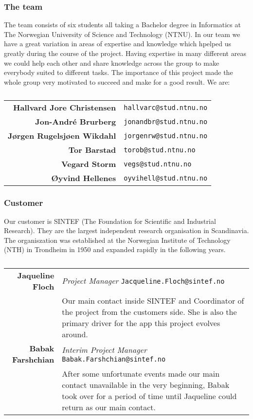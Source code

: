 \subsubsection{The team}
The team consists of six students all taking a Bachelor degree in Informatics at The Norwegian University of Science and Technology (NTNU). In our team we have a great variation in areas of expertise and knowledge which hpelped us greatly during the course of the project. Having expertise in many different areas we could help each other and share knowledge across the group to make everybody suited to different tasks. The importance of this project made the whole group very motivated to succeed and make for a good result.
We are:\\

\begin{table}[!ht]
\begin{tabular}{r|p{11cm}}
\textbf{Hallvard Jore Christensen} & \texttt{hallvarc@stud.ntnu.no}\\[6pt]
\textbf{Jon-André Brurberg} & \texttt{jonandbr@stud.ntnu.no}\\[6pt]
\textbf{Jørgen Rugelsjøen Wikdahl} & \texttt{jorgenrw@stud.ntnu.no}\\[6pt]
\textbf{Tor Barstad} & \texttt{torob@stud.ntnu.no}\\[6pt]
\textbf{Vegard Storm} & \texttt{vegs@stud.ntnu.no}\\[6pt]
\textbf{Øyvind Hellenes} & \texttt{oyvihell@stud.ntnu.no}\\
\end{tabular}
\captionsetup{textformat=empty,labelformat=blank}
\caption[The Team]{}
\end{table}

\subsubsection{Customer}
Our customer is SINTEF (The Foundation for Scientific and Industrial Research). They are the largest independent research organisation in Scandinavia. The organiszation was established at the Norwegian Institute of Technology (NTH) in Trondheim in 1950 and expanded rapidly in the following years.

\begin{table}[!ht]
\begin{tabular}{r|p{11cm}}
\textbf{Jaqueline Floch} & \emph{Project Manager}   \texttt{Jacqueline.Floch@sintef.no}\\[4pt]
& Our main contact inside SINTEF and Coordinator of the project from the customers side. She is also the primary driver for the app this project evolves around. \\[8pt]
\textbf{Babak Farshchian} & \emph{Interim Project Manager}   \texttt{Babak.Farshchian@sintef.no}\\[4pt]
& After some unfortunate events made our main contact unavailable in the very beginning, Babak took over for a period of time until Jaqueline could return as our main contact. \\
\end{tabular}
\captionsetup{textformat=empty,labelformat=blank}
\caption[Customer]{}
\end{table}


